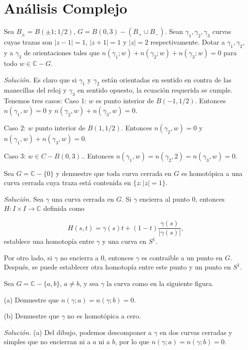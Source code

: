 \documentclass[12pt]{article}
\newcommand{\C}{\mathbb{C}}
\newenvironment{problem}[2][Problema]{\begin{trivlist}
\item[\hskip \labelsep {\bfseries #1}\hskip \labelsep {\bfseries #2.}]}{\end{trivlist}}
\begin{document}
\section*{Análisis Complejo}



\begin{problem}{3 pp. 87}
Sea $B_{\pm} = B(\pm 1; 1/2)$, $G=B(0,3)-(B_+ \cup B_{-})$. Sean $\gamma_1, \gamma_2, \gamma_3$ curvas cuyas trazas son $\lvert z-1\rvert = 1$, $\lvert z+1 \rvert = 1$ y $\lvert z \rvert = 2$ respectivamente. Dotar a $\gamma_1, \gamma_2, $ y a $\gamma_3$ de orientaciones tales que $n(\gamma_1; w) + n(\gamma_2; w) + n(\gamma_3; w) = 0$ para todo $w \in \C - G.$
\end{problem}
\textit{Solución.} Es claro que si $\gamma_1 $ y $ \gamma_2$ están orientadas en sentido en contra de las manecillas del reloj y $\gamma_3$ en sentido opuesto, la ecuación requerida se cumple. Tenemos tres casos:
Caso 1: $w$ es punto interior de $B(-1, 1/2).$ Entonces $n(\gamma_1, w) = 0$ y $n(\gamma_2, w) + n(\gamma_3, w) =0$.

Caso 2: $w$ punto interior de $B(1, 1/2).$ Entonces $n(\gamma_2, w) = 0$ y $n(\gamma_1, w) + n(\gamma_3, w) = 0$.

Caso 3: $w \in C - B(0, 3).$. Entonces $n(\gamma_1, w) = n(\gamma_2, 2) = n(\gamma_3, w) = 0.$


\begin{problem}{4 pp. 95}
Sea $G = \C - \{0\}$ y demuestre que toda curva cerrada en $G$ es homotópica a una curva cerrada cuya traza está contenida en $\{z: \lvert z \rvert = 1\}$.
\end{problem}
\textit{Solución.} Sea $\gamma$ una curva cerrada en $G.$ Si $\gamma$ encierra al punto $0$, entonces $H: I \times I \rightarrow \C $ definida como 

$$ H(s, t) = \gamma(s) t + (1-t) \frac{\gamma(s)}{\lvert \gamma(s) \rvert}, $$
establece una homotopía entre $\gamma$ y una curva en $S^1.$

Por otro lado, si $\gamma$ no encierra a $0$, entonces $\gamma $ es contraible a un punto en $G$. Después, se puede establecer otra homotopía entre este punto y un punto en $S^1.$



\begin{problem}{8 pp. 95}
Sea $G = \C - \{a, b\}$, $a \neq b$, y sea $\gamma$ la curva como en la siguiente figura. 

(a) Demuestre que $n(\gamma; a) = n(\gamma; b) = 0$.

(b) Demuestre que $\gamma$ no es homotópica a cero.

\end{problem}
\textit{Solución.} (a) Del dibujo, podemos descomponer a $\gamma$ en dos curvas cerradas y simples que no encierran ni a $a$ ni a $b$, por lo que $n(\gamma; a) = n(\gamma; b) = 0$.
\end{document}
